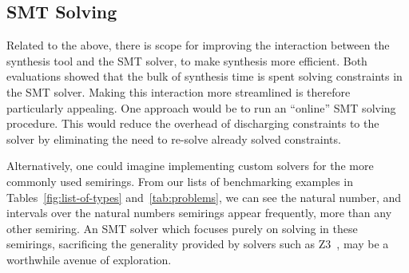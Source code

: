 \subsection{SMT Solving}
Related to the above, there is scope for improving the interaction between the
synthesis tool and the SMT solver, to make synthesis more efficient. Both
evaluations showed that the bulk of synthesis time is spent solving constraints
in the SMT solver. Making this interaction more streamlined is therefore
particularly appealing. One approach would be to run an ``online'' SMT solving
procedure. This would reduce the overhead of discharging constraints to the
solver by eliminating the need to re-solve already solved constraints. 

Alternatively, one could imagine implementing custom solvers for the more
commonly used semirings. From our lists of benchmarking examples in
Tables~\ref{fig:list-of-types} and~\ref{tab:problems}, we can see the natural
number, and intervals over the natural numbers semirings appear frequently, more
than any other semiring. An SMT solver which focuses purely on solving in these
semirings, sacrificing the generality provided by solvers such as Z3~\cite{z3},
may be a worthwhile avenue of exploration. 


